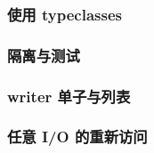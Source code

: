 \documentclass[./main.tex]{subfiles}
\begin{document}
\subsubsection*{使用 typeclasses}

\subsubsection*{隔离与测试}

\subsubsection*{writer 单子与列表}

\subsubsection*{任意 I/O 的重新访问}
\end{document}
